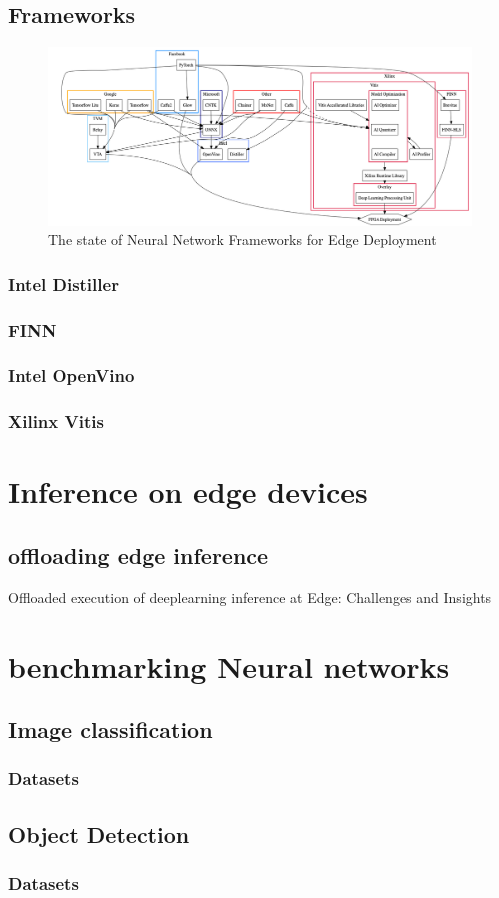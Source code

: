 \subsection{Frameworks}
\begin{figure}
\centering
\includegraphics[width=\textwidth]{Figures/diagram.png}
\caption[Neural Network Frameworks]{The state of Neural Network Frameworks for Edge Deployment}
\label{fig:Neural Network Frameworks}
\end{figure}


\subsubsection{Intel Distiller}
\subsubsection{FINN}
\subsubsection{Intel OpenVino}
\subsubsection{Xilinx Vitis}

\section{Inference on edge devices}

\subsection{offloading edge inference}
Offloaded execution of deeplearning inference at Edge: Challenges and Insights

\section{benchmarking Neural networks}


\subsection{Image classification}
\subsubsection{Datasets}
\subsection{Object Detection}
\subsubsection{Datasets}